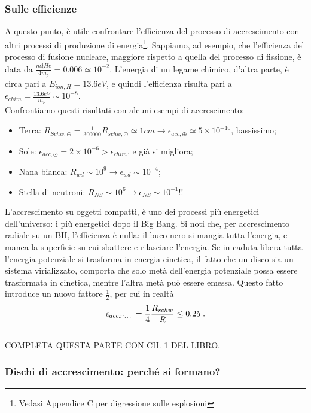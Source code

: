 \subsubsection{Sulle efficienze}
A questo punto, è utile confrontare l'efficienza del processo di accrescimento con altri processi di produzione di energia\footnote{Vedasi Appendice C per digressione sulle esplosioni}.
Sappiamo, ad esempio, che l'efficienza del processo di fusione nucleare, maggiore rispetto a quella del processo di fissione, è data da $\frac{m ^4_2He}{4m_p} = 0.006 \simeq 10^{-2} $.
L'energia di un legame chimico, d'altra parte, è circa pari a $E_{ion,H} = 13.6eV $, e quindi l'efficienza risulta pari a $\epsilon_{chim} = \frac{13.6eV}{m_p} \sim 10^{-8} $.\\
Confrontiamo questi risultati con alcuni esempi di accrescimento:
\begin{itemize}
    \item Terra: $R_{Schw,\oplus} = \frac{1}{300000}R_{schw,\odot} \simeq 1cm \xrightarrow{}  \epsilon_{acc,\oplus} \simeq 5\times10^{-10} $, bassissimo;
    \item Sole: $\epsilon_{acc,\odot} = 2\times10^{-6}>\epsilon_{chim} $, e già si migliora;
    \item Nana bianca: $R_{wd}\sim 10^{9} \xrightarrow{} \epsilon_{wd}\sim 10^{-4} $;
    \item Stella di neutroni:  $R_{NS}\sim 10^{6} \xrightarrow{} \epsilon_{NS}\sim 10^{-1} $!!
\end{itemize}
L'accrescimento su oggetti compatti, è uno dei processi più energetici dell'universo: i più energetici dopo il Big Bang.
Si noti che, per accrescimento radiale su un BH, l'efficienza è nulla: il buco nero si mangia tutta l'energia, e manca la superficie su cui sbattere e rilasciare l'energia.
Se in caduta libera tutta l'energia potenziale si trasforma in energia cinetica, il fatto che un disco sia un sistema virializzato, comporta che solo metà dell'energia potenziale possa essere trasformata in cinetica, mentre l'altra metà può essere emessa. Questo fatto introduce un nuovo fattore $\frac{1}{2}$, per cui in realtà
\begin{equation}
    \epsilon_{acc_{disco}} = \frac{1}{4}\frac{R_{schw}}{R} \le 0.25 \hspace{1mm} .
\end{equation}\\
COMPLETA QUESTA PARTE CON CH. 1 DEL LIBRO.

\subsubsection{Dischi di accrescimento: perché si formano?}

